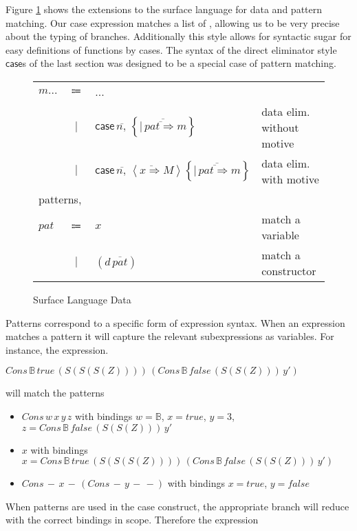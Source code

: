 Figure \ref{fig:surface-data} shows the extensions to the surface language for data and pattern matching.
Our case expression matches a list of \scruts{}, allowing us to be very precise about the typing of branches.
Additionally this style allows for syntactic sugar for easy definitions of functions by cases.
The syntax of the direct eliminator style $\mathsf{case}$s of the last section was designed to be a special case of pattern matching.

\begin{figure}
\begin{tabular}{lcll}
$m...$ & $\Coloneqq$ & ... & \tabularnewline
 & $|$ & $\mathsf{case}\,\overline{n,}\,\left\{ \overline{|\,\overline{pat\Rightarrow}m}\right\} $ & data elim. without motive\tabularnewline
 & $|$ & $\mathsf{case}\,\overline{n,}\,\left\langle \overline{x\Rightarrow}M\right\rangle \left\{ \overline{|\,\overline{pat\Rightarrow}m}\right\} $ & data elim. with motive\tabularnewline
\multicolumn{4}{l}{patterns,}\tabularnewline
$pat$ & $\Coloneqq$ & $x$ & match a variable\tabularnewline
 & $|$ & $(d\,\overline{pat})$ & match a constructor\tabularnewline
\end{tabular}

\caption{Surface Language Data}
\label{fig:surface-data}
\end{figure}

Patterns correspond to a specific form of expression syntax.
When an expression matches a pattern it will capture the relevant subexpressions as variables.
For instance, the expression. 

$Cons\,\mathbb{B}\,true\,\left(S\left(S\left(S\left(Z\right)\right)\right)\right)\,\left(Cons\,\mathbb{B}\,false\,\left(S\left(S\left(Z\right)\right)\right)\,y'\right)$

will match the patterns
\begin{itemize}
\item $Cons\,w\,x\,y\,z$ with bindings $w=\mathbb{B}$, $x=true$, $y=3$, $z=Cons\,\mathbb{B}\,false\,\left(S\left(S\left(Z\right)\right)\right)\,y'$
\item $x$ with bindings $x=Cons\,\mathbb{B}\,true\,\left(S\left(S\left(S\left(Z\right)\right)\right)\right)\,\left(Cons\,\mathbb{B}\,false\,\left(S\left(S\left(Z\right)\right)\right)\,y'\right)$ 
\item $Cons\,-\,x\,-\,\left(Cons\,-\,y\,-\,-\right)$ with bindings $x=true$, $y=false$
\end{itemize}
When patterns are used in the case construct, the appropriate branch will reduce with the correct bindings in scope.
Therefore the expression 

